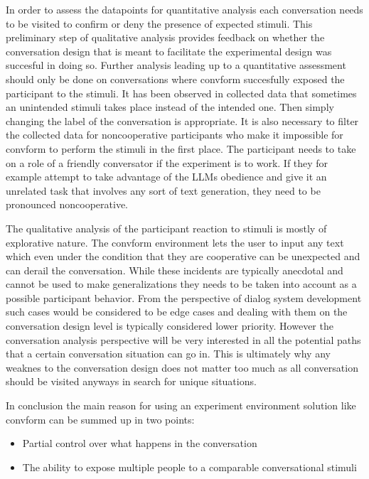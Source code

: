 In order to assess the datapoints for quantitative analysis
each conversation needs to be visited
to confirm or deny the presence of expected stimuli.
This preliminary step of qualitative analysis
provides feedback on whether the conversation design
that is meant to facilitate the experimental design
was succesful in doing so.
Further analysis leading up to a quantitative assessment
should only be done on conversations
where convform succesfully exposed the participant to the stimuli.
It has been observed in collected data
that sometimes an unintended stimuli
takes place instead of the intended one.
Then simply changing the label of the conversation is appropriate.
It is also necessary to filter the collected data for
noncooperative participants who make it impossible for convform
to perform the stimuli in the first place.
The participant needs to take on a role of a friendly conversator
if the experiment is to work.
If they for example attempt to take advantage of the LLMs obedience
and give it an unrelated task that involves any sort of text generation,
they need to be pronounced noncooperative.

The qualitative analysis of the participant reaction to stimuli
is mostly of explorative nature.
The convform environment lets the user to input any text
which even under the condition that they are cooperative
can be unexpected and can derail the conversation.
While these incidents are typically anecdotal
and cannot be used to make generalizations
they needs to be taken into account
as a possible participant behavior.
From the perspective of dialog system development
such cases would be considered to be edge cases
and dealing with them on the conversation design level
is typically considered lower priority.
However the conversation analysis perspective
will be very interested in all the potential paths that
a certain conversation situation can go in.
This is ultimately why any weaknes to the conversation design
does not matter too much
as all conversation should be visited anyways
in search for unique situations.

In conclusion the main reason for using
an experiment environment solution like convform
can be summed up in two points:

\begin{itemize}
\item{Partial control over what happens in the conversation}
\item{The ability to expose multiple people to a comparable conversational stimuli}
\end{itemize}

